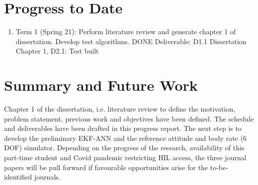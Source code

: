 \section{Progress to Date}\label{CHAP1_7}
\begin{enumerate}
    \item Term 1 (Spring 21):  Perform literature review and generate chapter 1 of dissertation. Develop test algorithms. DONE
    Deliverable: D1.1 Dissertation Chapter 1, D2.1: Test built

\end{enumerate}

\section{Summary and Future Work}\label{CHAP1_8}
Chapter 1 of the dissertation, i.e. literature review to define the motivation, problem statement, previous work and objectives have been defined. The schedule and deliverables have been drafted in this progress report. The next step is to develop the preliminary EKF-ANN and the reference attitude and body rate (6 DOF) simulator. Depending on the progress of the research, availability of this part-time student and Covid pandemic restricting HIL access, the three journal papers will be pull forward if favourable opportunities arise for the to-be-identified journals. 




